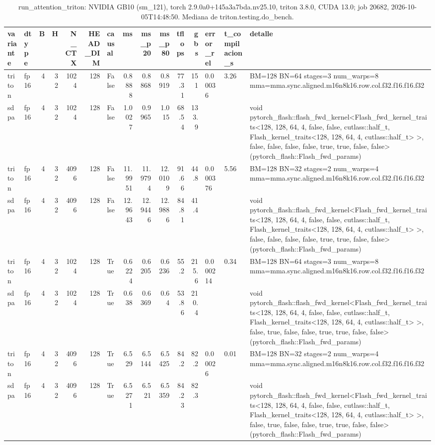 \begin{table}[htbp]
  \centering\small
  \begin{tabular}{llrrrrlrrrrrlll}
    \toprule
    variante & dtype & B & H & N\_CTX & HEAD\_DIM & causal & ms & ms\_p20 & ms\_p80 & tflops & gbs & error\_rel & t\_compilacion\_s & detalle \\
    \midrule
    triton & fp16 & 4 & 32 & 1024 & 128 & False & 0.8888 & 0.8868 & 0.8919 & 77.31 & 151 & 0.00036 & 3.26 & BM=128 BN=64 stages=3 num\_warps=8 mma=mma.sync.aligned.m16n8k16.row.col.f32.f16.f16.f32 \\
    sdpa & fp16 & 4 & 32 & 1024 & 128 & False & 1.0027 & 0.9965 & 1.015 & 68.54 & 133.9 &  &  & void pytorch\_flash::flash\_fwd\_kernel<Flash\_fwd\_kernel\_traits<128, 128, 64, 4, false, false, cutlass::half\_t, Flash\_kernel\_traits<128, 128, 64, 4, cutlass::half\_t> >, false, false, false, false, true, true, false, false>(pytorch\_flash::Flash\_fwd\_params) \\
    triton & fp16 & 4 & 32 & 4096 & 128 & False & 11.9951 & 11.9794 & 12.0109 & 91.66 & 44.8 & 0.000376 & 5.56 & BM=128 BN=32 stages=2 num\_warps=4 mma=mma.sync.aligned.m16n8k16.row.col.f32.f16.f16.f32 \\
    sdpa & fp16 & 4 & 32 & 4096 & 128 & False & 12.9643 & 12.9446 & 12.9886 & 84.81 & 41.4 &  &  & void pytorch\_flash::flash\_fwd\_kernel<Flash\_fwd\_kernel\_traits<128, 128, 64, 4, false, false, cutlass::half\_t, Flash\_kernel\_traits<128, 128, 64, 4, cutlass::half\_t> >, false, false, false, false, true, true, false, false>(pytorch\_flash::Flash\_fwd\_params) \\
    triton & fp16 & 4 & 32 & 1024 & 128 & True & 0.6224 & 0.6205 & 0.6236 & 55.2 & 215.6 & 0.000214 & 0.34 & BM=128 BN=64 stages=3 num\_warps=8 mma=mma.sync.aligned.m16n8k16.row.col.f32.f16.f16.f32 \\
    sdpa & fp16 & 4 & 32 & 1024 & 128 & True & 0.638 & 0.6369 & 0.64 & 53.86 & 210.4 &  &  & void pytorch\_flash::flash\_fwd\_kernel<Flash\_fwd\_kernel\_traits<128, 128, 64, 4, false, false, cutlass::half\_t, Flash\_kernel\_traits<128, 128, 64, 4, cutlass::half\_t> >, false, true, false, false, true, true, false, false>(pytorch\_flash::Flash\_fwd\_params) \\
    triton & fp16 & 4 & 32 & 4096 & 128 & True & 6.529 & 6.5144 & 6.5425 & 84.2 & 82.2 & 0.00026 & 0.01 & BM=128 BN=32 stages=2 num\_warps=4 mma=mma.sync.aligned.m16n8k16.row.col.f32.f16.f16.f32 \\
    sdpa & fp16 & 4 & 32 & 4096 & 128 & True & 6.5271 & 6.521 & 6.5359 & 84.23 & 82.3 &  &  & void pytorch\_flash::flash\_fwd\_kernel<Flash\_fwd\_kernel\_traits<128, 128, 64, 4, false, false, cutlass::half\_t, Flash\_kernel\_traits<128, 128, 64, 4, cutlass::half\_t> >, false, true, false, false, true, true, false, false>(pytorch\_flash::Flash\_fwd\_params) \\
    \bottomrule
  \end{tabular}
  \caption{run\_attention\_triton: NVIDIA GB10 (sm\_121), torch 2.9.0a0+145a3a7bda.nv25.10, triton 3.8.0, CUDA 13.0; job 20682, 2026-10-05T14:48:50. Mediana de triton.testing.do\_bench.}
  \label{tab:hennessy-run-attention-triton}
\end{table}
